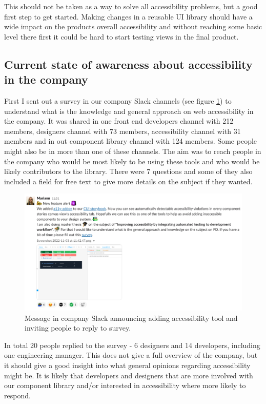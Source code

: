 \documentclass{master_thesis}
\begin{document}
This should not be taken as a way to solve all accessibility problems, but a good first step to get started. Making changes in a reusable UI library should have a wide impact on the products overall accessibility and without reaching some basic level there first it could be hard to start testing views in the final product.

\subsection{Current state of awareness about accessibility in the company}

First I sent out a survey in our company Slack channels (see figure \ref{fig:slack-message}) to understand what is the knowledge and general approach on web accessibility in the company. It was shared in one front end developers channel with 212 members, designers channel with 73 members, accessibility channel with 31 members and in out component library channel with 124 members. Some people might also be in more than one of these channels. The aim was to reach people in the company who would be most likely to be using these tools and who would be likely contributors to the library. There were 7 questions and some of they also included a field for free text to give more details on the subject if they wanted.

\begin{figure}[h]
	\includegraphics[width=\textwidth]{img/survey.png}
	\caption{Message in company Slack announcing adding accessibility tool and inviting people to reply to survey.}
	\label{fig:slack-message}
\end{figure}

In total 20 people replied to the survey - 6 designers and 14 developers, including one engineering manager. This does not give a full overview of the company, but it should give a good insight into what general opinions regarding accessibility might be. It is likely that developers and designers that are more involved with our component library and/or interested in accessibility where more likely to respond.
\end{document}
